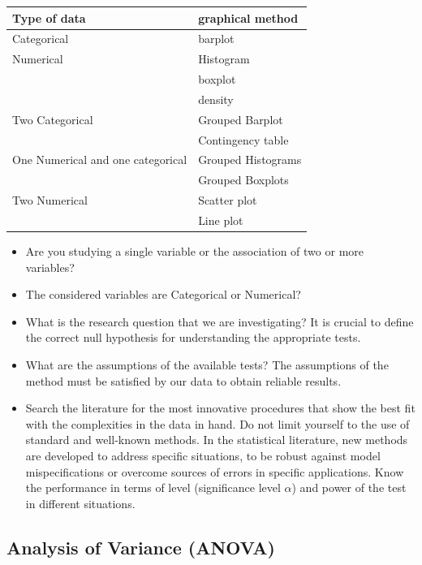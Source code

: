 \documentclass[
]{article}
\providecommand{\tightlist}{%
  \setlength{\itemsep}{0pt}\setlength{\parskip}{0pt}}
\begin{document}
\begin{longtable}[]{@{}ll@{}}
\toprule\noalign{}
\textbf{Type of data} & \textbf{graphical method} \\
\midrule\noalign{}
\endhead
\bottomrule\noalign{}
\endlastfoot
Categorical & barplot \\
Numerical & Histogram \\
& boxplot \\
& density \\
Two Categorical & Grouped Barplot \\
& Contingency table \\
One Numerical and one categorical & Grouped Histograms \\
& Grouped Boxplots \\
Two Numerical & Scatter plot \\
& Line plot \\
\end{longtable}

\begin{itemize}
\tightlist
\item
  Are you studying a single variable or the association of two or more
  variables?
\item
  The considered variables are Categorical or Numerical?
\item
  What is the research question that we are investigating? It is crucial
  to define the correct null hypothesis for understanding the
  appropriate tests.
\item
  What are the assumptions of the available tests? The assumptions of
  the method must be satisfied by our data to obtain reliable results.
\item
  Search the literature for the most innovative procedures that show the
  best fit with the complexities in the data in hand. Do not limit
  yourself to the use of standard and well-known methods. In the
  statistical literature, new methods are developed to address specific
  situations, to be robust against model mispecifications or overcome
  sources of errors in specific applications. Know the performance in
  terms of level (significance level \(\alpha\)) and power of the test
  in different situations.
\end{itemize}

\hypertarget{analysis-of-variance-anova}{%
\subsection{Analysis of Variance
(ANOVA)}\label{analysis-of-variance-anova}}
\end{document}
